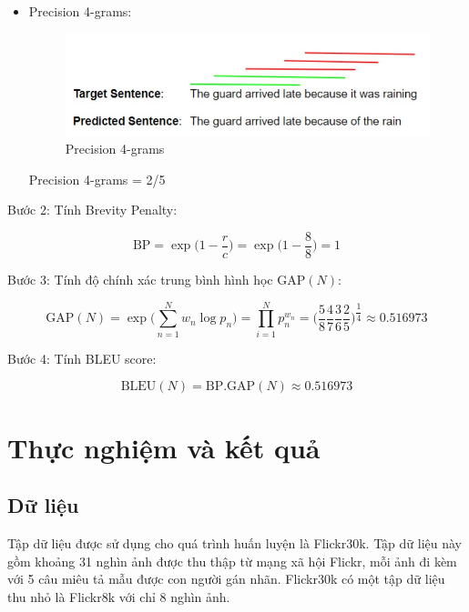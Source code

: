 \documentclass[14pt, a4paper]{article}
\numberwithin{equation}{section}
\numberwithin{algorithm}{section}
\numberwithin{figure}{section}
\numberwithin{table}{section}
\numberwithin{dl}{section}
\numberwithin{md}{section}
\numberwithin{bd}{section}
\numberwithin{dn}{section}
\numberwithin{hq}{section}
\begin{document}
\begin{itemize}
        \item Precision 4-grams:
        
        \begin{figure}[h!] \centering

            \includegraphics[scale=0.8]{BLEU_4.jpg}
            \caption{Precision 4-grams}

        \end{figure}
        
        Precision 4-grams = 2/5

    \end{itemize}

    Bước 2: Tính Brevity Penalty:

    \begin{equation}
        \mathrm{BP}=\exp\Big(1-\dfrac{r}{c}\Big)=\exp\Big(1-\dfrac{8}{8}\Big)=1
    \end{equation}

    Bước 3: Tính độ chính xác trung bình hình học $\mathrm{GAP}(N)$:

    \begin{equation}
        \mathrm{GAP}(N)=\exp\big( \sum_{n=1}^N w_n \log p_n \big)=\prod_{i=1}^N p_n^{w_n}=\Big(\dfrac{5}{8}\dfrac{4}{7}\dfrac{3}{6}\dfrac{2}{5}\Big)^{\dfrac{1}{4}}\approx 0.516973
    \end{equation}

    Bước 4: Tính BLEU score:

    \begin{equation}
        \mathrm{BLEU}(N)=\mathrm{BP}.\mathrm{GAP}(N)\approx 0.516973
    \end{equation}

    \section{Thực nghiệm và kết quả}

    \subsection{Dữ liệu}

    Tập dữ liệu được sử dụng cho quá trình huấn luyện là Flickr30k.
    Tập dữ liệu này gồm khoảng 31 nghìn ảnh được thu thập từ mạng xã hội Flickr, mỗi ảnh đi kèm với 5 câu miêu tả mẫu được con người gán nhãn.
    Flickr30k có một tập dữ liệu thu nhỏ là Flickr8k với chỉ 8 nghìn ảnh.
\end{document}
